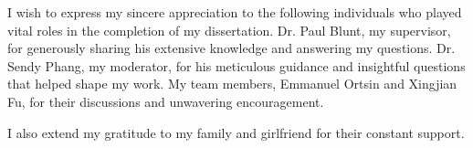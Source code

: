 \cleardoublepage
{}


\begin{acknowledgements}

I wish to express my sincere appreciation to the following individuals who played vital roles in the completion of my dissertation. Dr. Paul Blunt, my supervisor, for generously sharing his extensive knowledge and answering my questions. Dr. Sendy Phang, my moderator, for his meticulous guidance and insightful questions that helped shape my work. My team members, Emmanuel Ortsin and Xingjian Fu, for their discussions and unwavering encouragement.

I also extend my gratitude to my family and girlfriend for their constant support.

\end{acknowledgements}